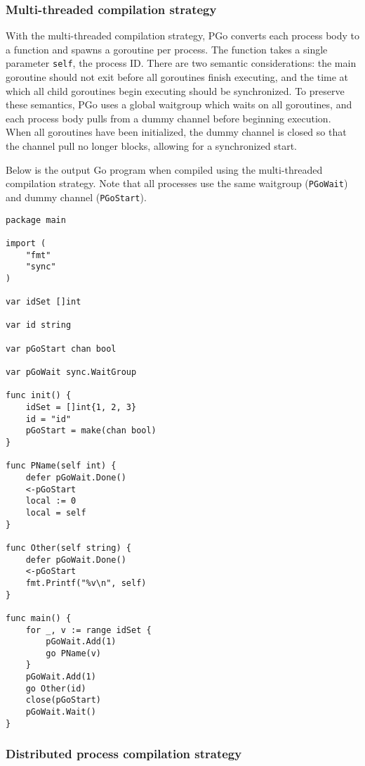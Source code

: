 \subsubsection{Multi-threaded compilation strategy}
With the multi-threaded compilation strategy, PGo converts each process body to a function and spawns a goroutine per process. The function takes a single parameter \texttt{self}, the process ID. There are two semantic considerations: the main goroutine should not exit before all goroutines finish executing, and the time at which all child goroutines begin executing should be synchronized. To preserve these semantics, PGo uses a global waitgroup which waits on all goroutines, and each process body pulls from a dummy channel before beginning execution. When all goroutines have been initialized, the dummy channel is closed so that the channel pull no longer blocks, allowing for a synchronized start.

Below is the output Go program when compiled using the multi-threaded compilation strategy. Note that all processes use the same waitgroup (\texttt{PGoWait}) and dummy channel (\texttt{PGoStart}).

\noindent
\begin{minipage}[t]{\textwidth}
\begin{lstlisting}[language=golang]
package main

import (
	"fmt"
	"sync"
)

var idSet []int

var id string

var pGoStart chan bool

var pGoWait sync.WaitGroup

func init() {
	idSet = []int{1, 2, 3}
	id = "id"
	pGoStart = make(chan bool)
}

func PName(self int) {
	defer pGoWait.Done()
	<-pGoStart
	local := 0
	local = self
}

func Other(self string) {
	defer pGoWait.Done()
	<-pGoStart
	fmt.Printf("%v\n", self)
}

func main() {
	for _, v := range idSet {
		pGoWait.Add(1)
		go PName(v)
	}
	pGoWait.Add(1)
	go Other(id)
	close(pGoStart)
	pGoWait.Wait()
}
\end{lstlisting}
\end{minipage}

\subsubsection{Distributed process compilation strategy}

